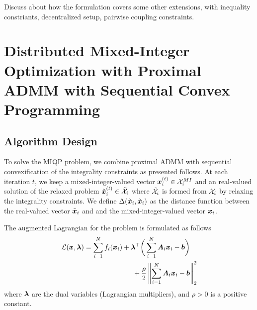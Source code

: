 \documentclass[twocolumn,amsthm]{autart}%
\theoremstyle{definition}
\newtheorem{definition}{Definition}
\theoremstyle{plain}
\begin{document}



Discuss about how the formulation covers some other extensions, \eg with inequality constriants, decentralized setup, pairwise coupling constraints. 

\section{Distributed Mixed-Integer Optimization with Proximal ADMM with Sequential Convex Programming}

\subsection{Algorithm Design}

To solve the MIQP problem, we combine proximal ADMM \cite{yang2022proximal} with sequential convexification of the integrality constraints as presented follows.
At each iteration $t$, we keep a mixed-integer-valued vector $\boldsymbol{x}_i^{(t)} \in \mathcal{X}_i^{\relax{MI}}$ and an real-valued solution of the relaxed problem $\tilde{\boldsymbol{x}}_i^{(t)} \in \tilde{\mathcal{X}}_i$ where $\tilde{\mathcal{X}}_i$ is formed from $\mathcal{X}_i$ by relaxing the integrality constraints.
We define $\Delta (\tilde{\boldsymbol{x}}_i, \tilde{\boldsymbol{x}}_i)$ as the distance function between the real-valued vector $\tilde{\boldsymbol{x}}_i$ and and the mixed-integer-valued vector $\boldsymbol{x}_i$.

The augmented Lagrangian for the problem is formulated as follows
\begin{equation}
\begin{multlined}
\LLL (\bbsym{x}, \bbsym{\lambda}) = \sum_{i=1}^{N} f_i ( \bbsym{x}_i) + \bbsym{\lambda}^\top \bigg(\sum_{i=1}^{N} \bbsym{A}_{i} \bbsym{x}_i - \bbsym{b} \bigg) \\
+ \frac{\rho}{2} \norm{\sum_{i=1}^{N} \bbsym{A}_{i} \bbsym{x}_i - \bbsym{b}}_2^2
\end{multlined}
\end{equation}
where $\boldsymbol{\lambda}$ are the dual variables (Lagrangian multipliers), and $\rho > 0$ is a positive constant.
\end{document}
